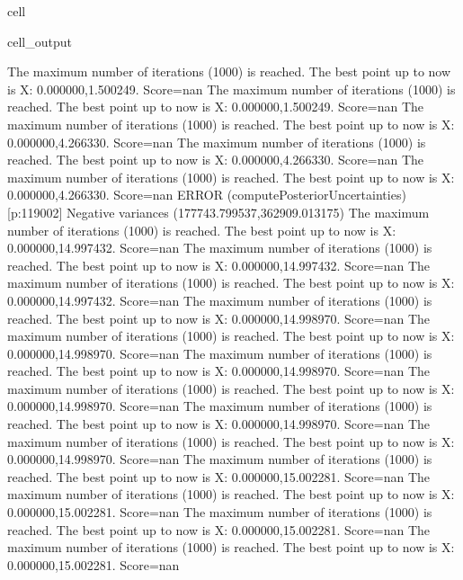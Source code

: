\documentclass[letterpaper,10pt,english]{jupyterBook}
\begin{document}
\begin{sphinxuseclass}{cell}
\begin{sphinxVerbatimOutput}
\begin{sphinxuseclass}{cell_output}
\begin{sphinxVerbatim}[commandchars=\\\{\}]
The maximum number of iterations (1000) is reached. The best point up to now is X: \PYGZob{}0.000000,1.500249\PYGZcb{}. Score=\PYGZhy{}nan
The maximum number of iterations (1000) is reached. The best point up to now is X: \PYGZob{}0.000000,1.500249\PYGZcb{}. Score=\PYGZhy{}nan
The maximum number of iterations (1000) is reached. The best point up to now is X: \PYGZob{}0.000000,4.266330\PYGZcb{}. Score=\PYGZhy{}nan
The maximum number of iterations (1000) is reached. The best point up to now is X: \PYGZob{}0.000000,4.266330\PYGZcb{}. Score=\PYGZhy{}nan
The maximum number of iterations (1000) is reached. The best point up to now is X: \PYGZob{}0.000000,4.266330\PYGZcb{}. Score=\PYGZhy{}nan
ERROR (compute\PYGZus{}Posterior\PYGZus{}Uncertainties) [p:119002] Negative variances (\PYGZhy{}177743.799537,\PYGZhy{}362909.013175)
The maximum number of iterations (1000) is reached. The best point up to now is X: \PYGZob{}0.000000,14.997432\PYGZcb{}. Score=\PYGZhy{}nan
The maximum number of iterations (1000) is reached. The best point up to now is X: \PYGZob{}0.000000,14.997432\PYGZcb{}. Score=\PYGZhy{}nan
The maximum number of iterations (1000) is reached. The best point up to now is X: \PYGZob{}0.000000,14.997432\PYGZcb{}. Score=\PYGZhy{}nan
The maximum number of iterations (1000) is reached. The best point up to now is X: \PYGZob{}0.000000,14.998970\PYGZcb{}. Score=\PYGZhy{}nan
The maximum number of iterations (1000) is reached. The best point up to now is X: \PYGZob{}0.000000,14.998970\PYGZcb{}. Score=\PYGZhy{}nan
The maximum number of iterations (1000) is reached. The best point up to now is X: \PYGZob{}0.000000,14.998970\PYGZcb{}. Score=\PYGZhy{}nan
The maximum number of iterations (1000) is reached. The best point up to now is X: \PYGZob{}0.000000,14.998970\PYGZcb{}. Score=\PYGZhy{}nan
The maximum number of iterations (1000) is reached. The best point up to now is X: \PYGZob{}0.000000,14.998970\PYGZcb{}. Score=\PYGZhy{}nan
The maximum number of iterations (1000) is reached. The best point up to now is X: \PYGZob{}0.000000,14.998970\PYGZcb{}. Score=\PYGZhy{}nan
The maximum number of iterations (1000) is reached. The best point up to now is X: \PYGZob{}0.000000,15.002281\PYGZcb{}. Score=\PYGZhy{}nan
The maximum number of iterations (1000) is reached. The best point up to now is X: \PYGZob{}0.000000,15.002281\PYGZcb{}. Score=\PYGZhy{}nan
The maximum number of iterations (1000) is reached. The best point up to now is X: \PYGZob{}0.000000,15.002281\PYGZcb{}. Score=\PYGZhy{}nan
The maximum number of iterations (1000) is reached. The best point up to now is X: \PYGZob{}0.000000,15.002281\PYGZcb{}. Score=\PYGZhy{}nan

\end{sphinxVerbatim}
\end{sphinxuseclass}
\end{sphinxVerbatimOutput}
\end{sphinxuseclass}
\end{document}
